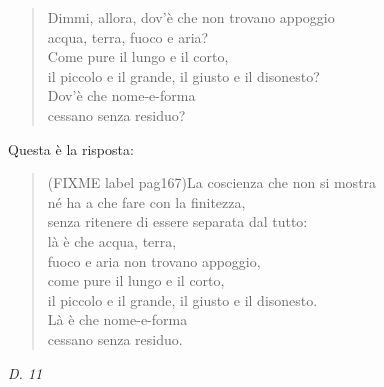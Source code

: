 \begin{quotation}
Dimmi, allora, dov’è che non trovano appoggio \\
acqua, terra, fuoco e aria? \\
Come pure il lungo e il corto, \\
il piccolo e il grande, il giusto e il disonesto? \\
Dov’è che nome-e-forma \\
cessano senza residuo?
\end{quotation}

Questa è la risposta:


\begin{quotation}
(FIXME label pag167)La coscienza che non si mostra \\
né ha a che fare con la finitezza, \\
senza ritenere di essere separata dal tutto: \\
là è che acqua, terra, \\
fuoco e aria non trovano appoggio, \\
come pure il lungo e il corto, \\
il piccolo e il grande, il giusto e il disonesto. \\
Là è che nome-e-forma \\
cessano senza residuo.
\end{quotation}

\emph{D. 11}


